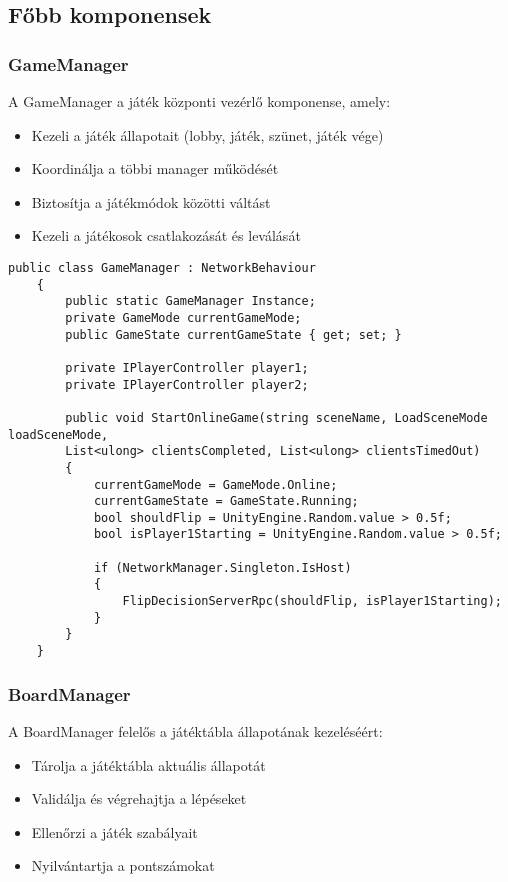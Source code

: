 \subsection{Főbb komponensek}

\subsubsection{GameManager}
A GameManager a játék központi vezérlő komponense, amely:
\begin{itemize}
	\item Kezeli a játék állapotait (lobby, játék, szünet, játék vége)
	\item Koordinálja a többi manager működését
	\item Biztosítja a játékmódok közötti váltást
	\item Kezeli a játékosok csatlakozását és leválását
\end{itemize}

\begin{lstlisting}[language={[Sharp]C}]
	public class GameManager : NetworkBehaviour
	{
		public static GameManager Instance;
		private GameMode currentGameMode;
		public GameState currentGameState { get; set; }
		
		private IPlayerController player1;
		private IPlayerController player2;
		
		public void StartOnlineGame(string sceneName, LoadSceneMode loadSceneMode, 
		List<ulong> clientsCompleted, List<ulong> clientsTimedOut)
		{
			currentGameMode = GameMode.Online;
			currentGameState = GameState.Running;
			bool shouldFlip = UnityEngine.Random.value > 0.5f;
			bool isPlayer1Starting = UnityEngine.Random.value > 0.5f;
			
			if (NetworkManager.Singleton.IsHost)
			{
				FlipDecisionServerRpc(shouldFlip, isPlayer1Starting);
			}
		}
	}
\end{lstlisting}

\subsubsection{BoardManager}
A BoardManager felelős a játéktábla állapotának kezeléséért:
\begin{itemize}
	\item Tárolja a játéktábla aktuális állapotát
	\item Validálja és végrehajtja a lépéseket
	\item Ellenőrzi a játék szabályait
	\item Nyilvántartja a pontszámokat
\end{itemize}

